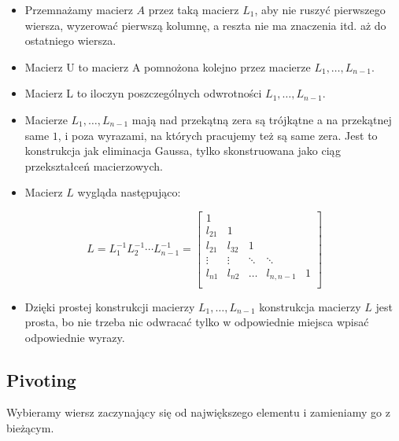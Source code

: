 \documentclass[a4paper]{article}
\begin{document}
\begin{itemize}
    \item Przemnażamy macierz $A$ przez taką macierz $L_1$, aby nie ruszyć pierwszego wiersza, wyzerować pierwszą kolumnę, a reszta nie ma znaczenia itd. aż do ostatniego wiersza.
    \item Macierz U to macierz A pomnożona kolejno przez macierze $L_1, \dots, L_{n-1}$.
    \item Macierz L to iloczyn poszczególnych odwrotności $L_1, \dots, L_{n-1}$.
    \item Macierze $L_1, \dots, L_{n-1}$ mają nad przekątną zera są trójkątne a na przekątnej same $1$, i poza wyrazami, na których pracujemy też są same zera. Jest to konstrukcja jak eliminacja Gaussa, tylko skonstruowana jako ciąg przekształceń macierzowych.
    \item Macierz $L$ wygląda następująco:
\end{itemize}
\begin{equation*}
    L = L_1^{-1}L_2^{-1} \cdots L_{n-1}^{-1} = 
    \begin{bmatrix}
        1 & & & & \\
        l_{21} & 1 & & & \\
        l_{21} &  l_{32} & 1 & & \\
        \vdots & \vdots & \ddots & \ddots & \\
        l_{n1} &  l_{n2} & \hdots & l_{n,n-1} & 1\\
    \end{bmatrix}
\end{equation*}

\begin{itemize}
    \item Dzięki prostej konstrukcji macierzy $L_1, \dots , L_{n-1}$ konstrukcja macierzy $L$ jest prosta, bo nie trzeba nic odwracać tylko w odpowiednie miejsca wpisać odpowiednie wyrazy.
\end{itemize}

\subsection{Pivoting}
Wybieramy wiersz zaczynający się od największego elementu i zamieniamy go z bieżącym.
\end{document}
